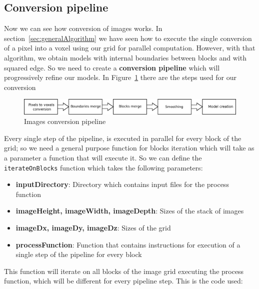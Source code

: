 \documentclass[11pt,oneside]{article}	%
\begin{document}
\subsection{Conversion pipeline}\label{sec:conversionpipeline}

Now we can see how conversion of images works. In section~\ref{sec:generalAlgorithm} we have seen how to execute the single conversion of a pixel into a voxel using our grid for parallel computation. However, with that algorithm, we obtain models with internal boundaries between blocks and with squared edge. So we need to create a \textbf{conversion pipeline} which will progressively refine our models. In Figure~\ref{fig:Pipeline} there are the steps used for our conversion

\begin{figure}[htb] %
   \centering
   \includegraphics[width=1.10\linewidth]{images/Pipeline.png}
   \caption{Images conversion pipeline}
   \label{fig:Pipeline}
\end{figure}

Every single step of the pipeline, is executed in parallel for every block of the grid; so we need a general purpose function for blocks iteration which will take as a parameter a function that will execute it. So we can define the \texttt{iterateOnBlocks} function which takes the following parameters:
\begin{itemize}
 \item \textbf{inputDirectory}: Directory which contains input files for the process function
 \item \textbf{imageHeight, imageWidth, imageDepth}: Sizes of the stack of images
 \item \textbf{imageDx, imageDy, imageDz}: Sizes of the grid
 \item \textbf{processFunction}: Function that contains instructions for execution of a single step of the pipeline for every block
\end{itemize}

This function will iterate on all blocks of the image grid executing the process function, which will be different for every pipeline step. This is the code used:
\end{document}
